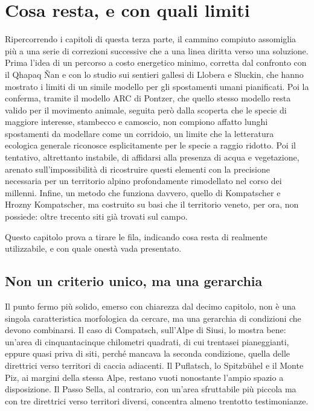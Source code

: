 \chapter{Cosa resta, e con quali limiti}
\label{cap:cosa_resta}

Ripercorrendo i capitoli di questa terza parte, il cammino compiuto assomiglia più a una serie di correzioni successive che a una linea diritta verso una soluzione. Prima l'idea di un percorso a costo energetico minimo, corretta dal confronto con il Qhapaq Ñan e con lo studio sui sentieri gallesi di Llobera e Sluckin, che hanno mostrato i limiti di un simile modello per gli spostamenti umani pianificati. Poi la conferma, tramite il modello ARC di Pontzer, che quello stesso modello resta valido per il movimento animale, seguita però dalla scoperta che le specie di maggiore interesse, stambecco e camoscio, non compiono affatto lunghi spostamenti da modellare come un corridoio, un limite che la letteratura ecologica generale riconosce esplicitamente per le specie a raggio ridotto. Poi il tentativo, altrettanto instabile, di affidarsi alla presenza di acqua e vegetazione, arenato sull'impossibilità di ricostruire questi elementi con la precisione necessaria per un territorio alpino profondamente rimodellato nel corso dei millenni. Infine, un metodo che funziona davvero, quello di Kompatscher e Hrozny Kompatscher, ma costruito su basi che il territorio veneto, per ora, non possiede: oltre trecento siti già trovati sul campo.

Questo capitolo prova a tirare le fila, indicando cosa resta di realmente utilizzabile, e con quale onestà vada presentato.

\section{Non un criterio unico, ma una gerarchia}

Il punto fermo più solido, emerso con chiarezza dal decimo capitolo, non è una singola caratteristica morfologica da cercare, ma una gerarchia di condizioni che devono combinarsi. Il caso di Compatsch, sull'Alpe di Siusi, lo mostra bene: un'area di cinquantacinque chilometri quadrati, di cui trentasei pianeggianti, eppure quasi priva di siti, perché mancava la seconda condizione, quella delle direttrici verso territori di caccia adiacenti. Il Puflatsch, lo Spitzbühel e il Monte Piz, ai margini della stessa Alpe, restano vuoti nonostante l'ampio spazio a disposizione. Il Passo Sella, al contrario, con un'area sfruttabile più piccola ma con tre direttrici verso territori diversi, concentra almeno trentotto testimonianze.

